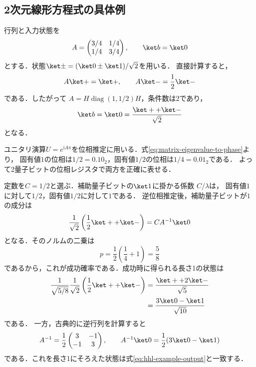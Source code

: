\subsection{2次元線形方程式の具体例}
\label{sec:hhl-example-2d}

\begin{ex}
行列と入力状態を
\begin{equation}
 A=\begin{pmatrix}3/4&1/4\\1/4&3/4\end{pmatrix},
 \qquad \ket b=\ket0
 \label{eq:hhl-example-data}
\end{equation}
とする．状態$\ket\pm=(\ket0\pm\ket1)/\sqrt2$を用いる．
直接計算すると，
\[
 A\ket+=\ket+,
 \qquad A\ket-=\frac12\ket-
\]
である．したがって
$A=H\operatorname{diag}(1,1/2)H$，条件数は$2$であり，
\begin{equation}
 \ket b=\ket0=\frac{\ket++\ket-}{\sqrt2}
 \label{eq:hhl-example-input-eigenbasis}
\end{equation}
となる．

ユニタリ演算$U=e^{\mathrm{i}A\pi}$を位相推定に用いる．式\eqref{eq:matrix-eigenvalue-to-phase}より，
固有値$1$の位相は$1/2=0.10_2$，固有値$1/2$の位相は$1/4=0.01_2$である．
よって2量子ビットの位相レジスタで両方を正確に表せる．

定数を$C=1/2$と選ぶ．補助量子ビットの$\ket1$に掛かる係数
$C/\lambda$は，
固有値$1$に対して$1/2$，固有値$1/2$に対して$1$である．
逆位相推定後，補助量子ビットが$1$の成分は
\begin{equation}
 \frac1{\sqrt2}\left(\frac12\ket++\ket-\right)
 =CA^{-1}\ket0
 \label{eq:hhl-example-success-component}
\end{equation}
となる．そのノルムの二乗は
\[
 p=\frac12\left(\frac14+1\right)=\frac58
\]
であるから，これが成功確率である．成功時に得られる長さ1の状態は
\begin{align}
 \frac{1}{\sqrt{5/8}}
 \frac1{\sqrt2}\left(\frac12\ket++\ket-\right)
 &=\frac{\ket++2\ket-}{\sqrt5}\\
 &=\frac{3\ket0-\ket1}{\sqrt{10}}
 \label{eq:hhl-example-output}
\end{align}
である．
一方，古典的に逆行列を計算すると
\[
 A^{-1}=\frac12\begin{pmatrix}3&-1\\-1&3\end{pmatrix},
 \qquad A^{-1}\ket0=\frac12(3\ket0-\ket1)
\]
である．これを長さ1にそろえた状態は式\eqref{eq:hhl-example-output}と一致する．
\end{ex}
